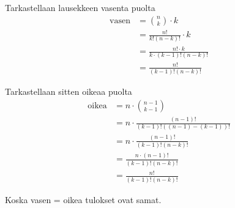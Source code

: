\documentclass[12pt,a4paper]{article}
\begin{document}
\begin{kohta}
Tarkastellaan lausekkeen vasenta puolta
\begin{align*}
\text{vasen} &= \binom{n}{k} \cdot k \\
&= \frac{n!}{k!(n-k)!} \cdot k \\
&= \frac{n! \cdot k}{k \cdot (k-1)!(n-k)!} \\
&= \frac{n!}{(k-1)!(n-k)!}
\end{align*}

Tarkastellaan sitten oikeaa puolta
\begin{align*}
\text{oikea} &= n \cdot \binom{n-1}{k-1} \\
&= n \cdot \frac{(n-1)!}{(k-1)!((n-1)-(k-1))!} \\
&= n \cdot \frac{(n-1)!}{(k-1)!(n-k)!} \\
&= \frac{n \cdot (n-1)!}{(k-1)!(n-k)!} \\
&= \frac{n!}{(k-1)!(n-k)!}
\end{align*}

Koska vasen = oikea tulokset ovat samat.

\end{kohta}
\end{document}
